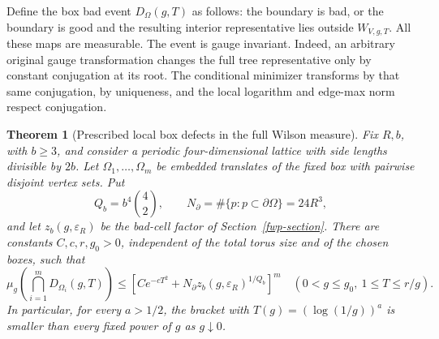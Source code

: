 \documentclass[11pt]{article}
\newtheorem{theorem}{Theorem}[section]
\theoremstyle{remark}
\begin{document}
Define the box bad event \(D_\Omega(g,T)\) as follows:
the boundary is bad, or the boundary is good and the resulting
interior representative lies outside \(W_{V,g,T}\). All these maps
are measurable. The event is gauge invariant. Indeed, an arbitrary
original gauge transformation changes the full tree representative
only by constant conjugation at its root. The conditional minimizer
transforms by that same conjugation, by uniqueness, and the local
logarithm and edge-max norm respect conjugation.

\begin{theorem}[Prescribed local box defects in the full Wilson measure]
\label{fbb:boxes}
Fix \(R,b\), with \(b\geq3\), and consider a periodic four-dimensional
lattice with side lengths divisible by \(2b\). Let
\(\Omega_1,\ldots,\Omega_m\) be embedded translates of the fixed box
with pairwise disjoint vertex sets. Put
\[
 Q_b=b^4\binom42,\qquad
 N_\partial=\#\{p:p\subset\partial\Omega\}=24R^3,
\]
and let \(z_b(g,\varepsilon_R)\) be the bad-cell factor of
Section~\ref{fwp-section}. There are constants \(C,c,r,g_0>0\),
independent of the total torus size and of the chosen boxes, such
that
\begin{equation}
 \mu_g\left(\bigcap_{i=1}^m D_{\Omega_i}(g,T)\right)
 \leq \left[
       C e^{-cT^2}
       +N_\partial z_b(g,\varepsilon_R)^{1/Q_b}
       \right]^m
 \quad(0<g\leq g_0,\ 1\leq T\leq r/g).
 \label{fbb:joint}
\end{equation}
In particular, for every \(a>1/2\), the bracket with
\(T(g)=(\log(1/g))^a\) is smaller than every fixed power of \(g\)
as \(g\downarrow0\).
\end{theorem}
\end{document}
